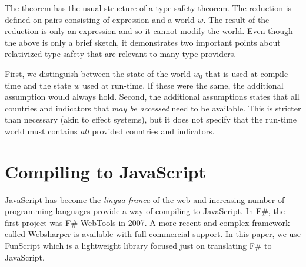 \documentclass[submission,copyright,creativecommons]{eptcs}
\begin{document}
\noindent
The theorem has the usual structure of a type safety theorem. The reduction is defined on pairs
consisting of expression and a world $w$. The result of the reduction is only an expression and
so it cannot modify the world. Even though the above is only a brief sketch, it demonstrates two
important points about relativized type safety that are relevant to many type providers.

First, we distinguish between the state of the world $w_0$ that is used at compile-time and the 
state $w$ used at run-time. If these were the same, the additional assumption would always hold.
Second, the additional assumptions states that all countries and indicators that \emph{may be
accessed} need to be available. This is stricter than necessary (akin to effect systems),
but it does not specify that the run-time world must contains \emph{all} provided countries 
and indicators.

                                                                                                     
%
%

\section{Compiling to JavaScript}
\label{sec:js}

JavaScript has become the \emph{lingua franca} of the web and increasing number of programming 
languages provide a way of compiling to JavaScript. In F\#, the first project was F\# WebTools
\cite{fsharp-webtools} in 2007. A more recent and complex framework called Websharper \cite{websharper-guis} 
is available with full commercial support. In this paper, we use FunScript which is a lightweight
library focused just on translating F\# to JavaScript.
\end{document}
